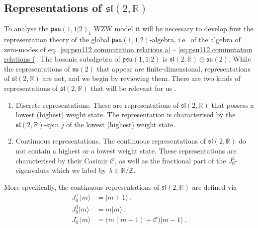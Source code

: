 \documentclass[12pt,a4paper]{article}
\newcommand{\ket}[1]{| #1\rangle}
\begin{document}
\subsection{Representations of $\mathfrak{sl}(2,\mathds{R})$} \label{subsec:representations sl2R}

To analyse the $\mathfrak{psu}(1,1|2)_1$ WZW model it will be necessary to develop first the representation theory of the global $\mathfrak{psu}(1,1|2)$-algebra, i.e.\ of the algebra of zero-modes of eq.~\eqref{eq:psu112 commutation relations a} -- \eqref{eq:psu112 commutation relations i}. %
%
%
The bosonic subalgebra of $\mathfrak{psu}(1,1|2)$ is $\mathfrak{sl}(2,\mathds{R}) \oplus \mathfrak{su}(2)$. While the representations of $\mathfrak{su}(2)$ that appear are finite-dimensional, representations of $\mathfrak{sl}(2,\mathds{R})$ are not, and we begin by reviewing them.
%
There are two kinds of representations of $\mathfrak{sl}(2,\mathds{R})$ that will be relevant for us \cite{Maldacena:2000hw}.
\begin{enumerate}
\item Discrete representations. These are representations of $\mathfrak{sl}(2,\mathds{R})$ that possess a lowest (highest) weight state. The representation is characterised by the $\mathfrak{sl}(2,\mathds{R})$-spin $j$ of the lowest (highest) weight state.
\item Continuous representations. The continuous representations of $\mathfrak{sl}(2,\mathds{R})$  do not contain  a highest or a lowest weight state. These representations are characterised by their Casimir $\mathcal{C}$, as well as the fractional part of the $J^3_0$-eigenvalues which we label by $\lambda \in \mathds{R}/\mathds{Z}$.
\end{enumerate}
More specifically, the continuous representations of $\mathfrak{sl}(2,\mathds{R})$ are defined via
\begin{subequations}\label{mbasis}
\begin{align}
J^+_0 \ket{m}&=\ket{m+1}\ , \label{eq:sl2R continuous representation a}\\
J^3_0 \ket{m}&=m \ket{m}\ , \label{eq:sl2R continuous representation b}\\
J^-_0 \ket{m}&=\big(m(m-1)+\mathcal{C}\big) \ket{m-1}\ . \label{eq:sl2R continuous representation c}
\end{align}
\end{subequations}
\end{document}
